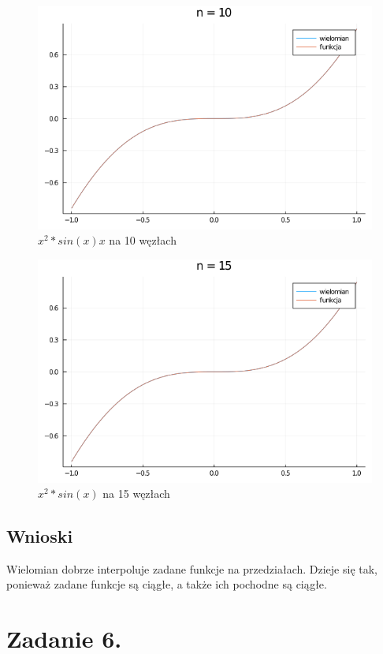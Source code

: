 \documentclass[12pt]{article}
\begin{document}
\begin{figure}[h!]
    \caption{$x^2 * sin(x)x$ na 10 węzłach}
    \centering
    \includegraphics[scale=0.5]{z5g_10.png}
\end{figure}
\begin{figure}[h!]
    \caption{$x^2 * sin(x)$ na 15 węzłach}
    \centering
    \includegraphics[scale=0.5]{z5g_15.png}
\end{figure}


\subsection{Wnioski}
Wielomian dobrze interpoluje zadane funkcje na przedziałach.
Dzieje się tak, ponieważ zadane funkcje są ciągłe, a także ich pochodne są ciągłe.

\section{Zadanie 6.}
\end{document}
